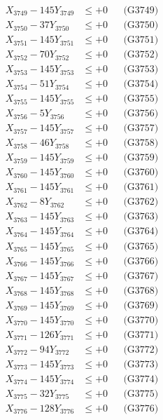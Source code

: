 \documentclass[a4paper,10pt]{article}
\begin{document}
{\begin{align}
X_{3749} - 145Y_{3749} &\leq +0 && \text{(G3749)} \\
X_{3750} - 37Y_{3750} &\leq +0 && \text{(G3750)} \\
\allowbreak
X_{3751} - 145Y_{3751} &\leq +0 && \text{(G3751)} \\
X_{3752} - 70Y_{3752} &\leq +0 && \text{(G3752)} \\
X_{3753} - 145Y_{3753} &\leq +0 && \text{(G3753)} \\
X_{3754} - 51Y_{3754} &\leq +0 && \text{(G3754)} \\
X_{3755} - 145Y_{3755} &\leq +0 && \text{(G3755)} \\
X_{3756} - 5Y_{3756} &\leq +0 && \text{(G3756)} \\
X_{3757} - 145Y_{3757} &\leq +0 && \text{(G3757)} \\
X_{3758} - 46Y_{3758} &\leq +0 && \text{(G3758)} \\
X_{3759} - 145Y_{3759} &\leq +0 && \text{(G3759)} \\
X_{3760} - 145Y_{3760} &\leq +0 && \text{(G3760)} \\
\allowbreak
X_{3761} - 145Y_{3761} &\leq +0 && \text{(G3761)} \\
X_{3762} - 8Y_{3762} &\leq +0 && \text{(G3762)} \\
X_{3763} - 145Y_{3763} &\leq +0 && \text{(G3763)} \\
X_{3764} - 145Y_{3764} &\leq +0 && \text{(G3764)} \\
X_{3765} - 145Y_{3765} &\leq +0 && \text{(G3765)} \\
X_{3766} - 145Y_{3766} &\leq +0 && \text{(G3766)} \\
X_{3767} - 145Y_{3767} &\leq +0 && \text{(G3767)} \\
X_{3768} - 145Y_{3768} &\leq +0 && \text{(G3768)} \\
X_{3769} - 145Y_{3769} &\leq +0 && \text{(G3769)} \\
X_{3770} - 145Y_{3770} &\leq +0 && \text{(G3770)} \\
\allowbreak
X_{3771} - 126Y_{3771} &\leq +0 && \text{(G3771)} \\
X_{3772} - 94Y_{3772} &\leq +0 && \text{(G3772)} \\
X_{3773} - 145Y_{3773} &\leq +0 && \text{(G3773)} \\
X_{3774} - 145Y_{3774} &\leq +0 && \text{(G3774)} \\
X_{3775} - 32Y_{3775} &\leq +0 && \text{(G3775)} \\
X_{3776} - 128Y_{3776} &\leq +0 && \text{(G3776)} \\

\end{align}}
\end{document}
